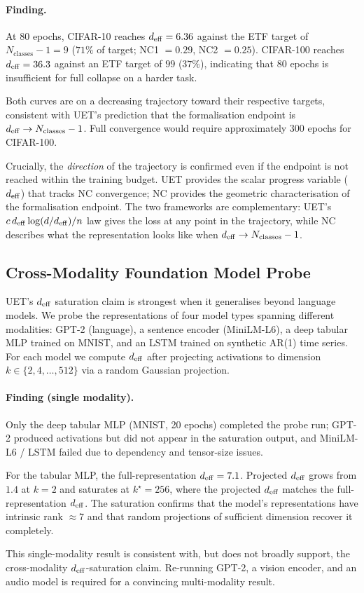 \paragraph{Finding.}
At 80 epochs, CIFAR-10 reaches $d_{\mathrm{eff}} = 6.36$ against the ETF target of
$N_\mathrm{classes}-1 = 9$ ($71\%$ of target; NC1 $= 0.29$, NC2 $= 0.25$).
CIFAR-100 reaches $d_{\mathrm{eff}} = 36.3$ against an ETF target of $99$ ($37\%$),
indicating that 80 epochs is insufficient for full collapse on a harder task.

Both curves are on a decreasing trajectory toward their respective targets,
consistent with UET's prediction that the formalisation endpoint is
$d_{\mathrm{eff}} \to N_\mathrm{classes} - 1$.
Full convergence would require approximately 300 epochs for CIFAR-100.

Crucially, the \emph{direction} of the trajectory is confirmed even if the
endpoint is not reached within the training budget.
UET provides the scalar progress variable ($d_{\mathrm{eff}}$) that tracks NC convergence;
NC provides the geometric characterisation of the formalisation endpoint.
The two frameworks are complementary: UET's $c\,d_{\mathrm{eff}}\log(d/d_{\mathrm{eff}})/n$ law gives
the loss at any point in the trajectory, while NC describes what the representation
looks like when $d_{\mathrm{eff}} \to N_\mathrm{classes}-1$.

\subsection{Cross-Modality Foundation Model Probe}
\label{sec:fm-probe}

UET's $d_{\mathrm{eff}}$ saturation claim is strongest when it generalises beyond language
models.
We probe the representations of four model types spanning different modalities:
GPT-2 (language), a sentence encoder (MiniLM-L6), a deep tabular MLP trained on
MNIST, and an LSTM trained on synthetic AR(1) time series.
For each model we compute $d_{\mathrm{eff}}$ after projecting activations to dimension
$k \in \{2, 4, \ldots, 512\}$ via a random Gaussian projection.

\paragraph{Finding (single modality).}
Only the deep tabular MLP (MNIST, 20 epochs) completed the probe run;
GPT-2 produced activations but did not appear in the saturation output,
and MiniLM-L6 / LSTM failed due to dependency and tensor-size issues.

For the tabular MLP, the full-representation $d_{\mathrm{eff}} = 7.1$.
Projected $d_{\mathrm{eff}}$ grows from $1.4$ at $k=2$ and saturates at $k^\star = 256$,
where the projected $d_{\mathrm{eff}}$ matches the full-representation $d_{\mathrm{eff}}$.
The saturation confirms that the model's representations have intrinsic rank $\approx7$
and that random projections of sufficient dimension recover it completely.

This single-modality result is consistent with, but does not broadly support,
the cross-modality $d_{\mathrm{eff}}$-saturation claim.
Re-running GPT-2, a vision encoder, and an audio model is required for a
convincing multi-modality result.
